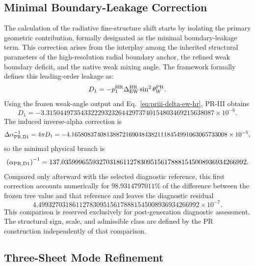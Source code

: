 \documentclass[11pt]{article}
\begin{document}
\subsection{Minimal Boundary-Leakage Correction}
\label{subsec:priii-minimal-boundary-leakage}
The calculation of the radiative fine-structure shift starts by isolating the primary geometric contribution, formally designated as the minimal boundary-leakage term. This correction arises from the interplay among the inherited structural parameters of the high-resolution radial boundary anchor, the refined weak boundary deficit, and the native weak mixing angle. The framework formally defines this leading-order leakage as:
\begin{equation}
D_1
=
-p_1^{\rm HR}
\Delta_{\rm EW}^{\rm HR}
\sin^2\theta_W^{\rm PR}.
\label{eq:priii-alpha-D1}
\end{equation}
Using the frozen weak-angle output and Eq.~\eqref{eq:priii-delta-ew-hr}, PR-III obtains
\begin{equation}
D_1
=
-3.3150449735433222932326442973740154803469215638087\times 10^{-6}  .
\end{equation}
The induced inverse-alpha correction is
\begin{equation}
\Delta\alpha_{\rm PR,D1}^{-1}
=
4\pi D_1
=
-4.1658083740813887216904843821118454991063065733008\times 10^{-5},
\end{equation}
so the minimal physical branch is
\begin{equation}
\left(\alpha_{\rm PR,D1}\right)^{-1}
=
137.035999655932703186112783095156178881545008936934266992 .
\end{equation}
Compared only afterward with the selected diagnostic reference, this first
correction accounts numerically for \(98.9314797011\%\) of the difference
between the frozen tree value and that reference and leaves the diagnostic
residual
\begin{equation}
4.49932703186112783095156178881545008936934266992\times 10^{-7}.
\end{equation}
This comparison is reserved exclusively for post-generation diagnostic
assessment.  The structural sign, scale, and admissible class are defined by the PR construction independently of that comparison.

\subsection{Three-Sheet Mode Refinement}
\label{subsec:priii-three-sheet-D2-refinement}
\end{document}
